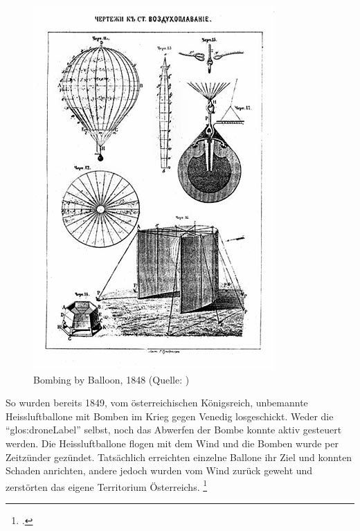 \begin{figure}
	\includegraphics[width=1.0\linewidth]{images/analysis/balloonbombs1849.jpg}
 	\caption[Bombing by Balloon, 1848]{Bombing by Balloon, 1848 (Quelle: )}
\end{figure}

So wurden bereits 1849, vom österreichischen Königsreich, unbemannte Heissluftballone mit Bomben im Krieg gegen Venedig losgeschickt.
Weder die "`\gls{glos:droneLabel}"' selbst, noch das Abwerfen der Bombe konnte aktiv gesteuert werden.
Die Heissluftballone flogen mit dem Wind und die Bomben wurde per Zeitzünder gezündet. Tatsächlich erreichten einzelne Ballone ihr Ziel und konnten Schaden anrichten, andere jedoch wurden vom Wind zurück geweht und zerstörten das eigene Territorium Österreichs. \footcite{Remote_Piloted_Aerial_Vehicles_2015-03-21}

